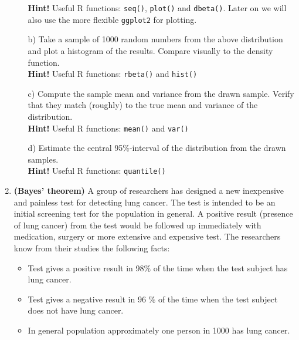 \documentclass[11pt,a4paper,english]{article}
\begin{document}
\begin{enumerate}
\begin{itemize}
 \textbf{Hint!} Useful R functions: {\tt seq()}, {\tt plot()} and {\tt dbeta()}. Later on we will also use the more flexible {\tt ggplot2} for plotting.

    \item[b)] Take a sample of 1000 random numbers from the above distribution and plot a histogram of the results. Compare visually to the density function.\\
    \textbf{Hint!} Useful R functions: {\tt rbeta()} and {\tt hist()}
    \item[c)] Compute the sample mean and variance from the drawn sample. Verify that they match (roughly) to the true mean and variance of the distribution.\\
\textbf{Hint!} Useful R functions: {\tt mean()} and {\tt var()}
    \item[d)] Estimate the central 95\%-interval of the distribution from the drawn samples.\\
\textbf{Hint!} Useful R functions: {\tt quantile()}
\end{itemize}



\item {\bf (Bayes' theorem)} A group of researchers has designed a new inexpensive and
  painless test for detecting lung cancer. The test is
  intended to be an initial screening test for the population in
  general. A positive result (presence of lung cancer) from the test
  would be followed up immediately with medication, surgery or more
  extensive and expensive test. The researchers know from their
  studies the following facts:
  \begin{itemize}
  \item Test gives a positive result in 98$\%$  of the time when the
    test subject has lung cancer.
  \item Test gives a negative result in 96 $\%$ of the time when the
    test subject does not have lung cancer.
  \item In general population approximately one person in 1000 has
    lung cancer.
  \end{itemize}


\end{enumerate}
\end{document}
